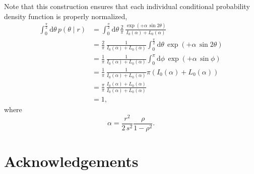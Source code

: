\documentclass[
  letterpaper,
  DIV=11,
  numbers=noendperiod]{scrartcl}
\begin{document}
Note that this construction ensures that each individual conditional
probability density function is properly normalized, \begin{align*}
\int_{0}^{\frac{\pi}{2}} \mathrm{d} \theta \, p(\theta \mid r)
&=
\int_{0}^{\frac{\pi}{2}} \mathrm{d} \theta \,
\frac{2}{\pi} \,
\frac{
\exp \left( + \alpha \, \sin 2 \theta \right)
}{
  I_{0} \left( \alpha \right) + L_{0} \left( \alpha \right)
}
\\
&=
\frac{2}{\pi} \,
\frac{1}{
  I_{0} \left( \alpha \right) + L_{0} \left( \alpha \right)
}
\int_{0}^{\frac{\pi}{2}} \mathrm{d} \theta \,
\exp \left( + \alpha \, \sin 2 \theta \right)
\\
&=
\frac{1}{\pi} \,
\frac{1}{
  I_{0} \left( \alpha \right) + L_{0} \left( \alpha \right)
}
\int_{0}^{\pi} \mathrm{d} \phi \,
\exp \left( + \alpha \, \sin \phi \right)
\\
&=
\frac{1}{\pi} \,
\frac{1}{
  I_{0} \left( \alpha \right) + L_{0} \left( \alpha \right)
}
\pi \left(
  I_{0} \left( \alpha \right) + L_{0} \left( \alpha \right)
\right)
\\
&=
\frac{\pi}{\pi} \,
\frac{
  I_{0} \left( \alpha \right) + L_{0} \left( \alpha \right)
}{
  I_{0} \left( \alpha \right) + L_{0} \left( \alpha \right)
}
\\
&=
1,
\end{align*} where \[
\alpha = \frac{r^{2}}{2 \, s^{2}} \frac{\rho}{1 - \rho^{2}}.
\]

\section*{Acknowledgements}\label{acknowledgements}
\end{document}

